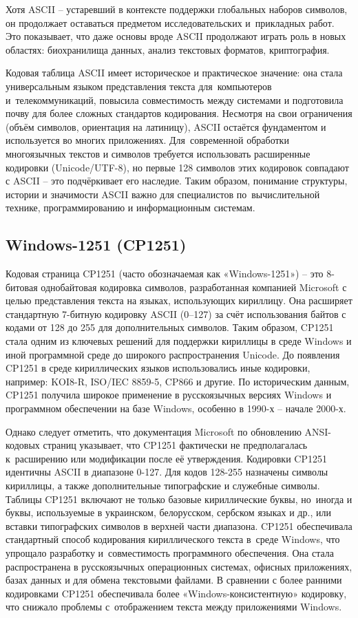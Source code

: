 \documentclass{ou}
\begin{document}
Хотя ASCII -- устаревший в контексте поддержки глобальных наборов символов, он продолжает оставаться предметом исследовательских и~прикладных работ. Это показывает, что даже основы вроде ASCII продолжают играть роль в новых областях: биохранилища данных, анализ текстовых форматов, криптография.

Кодовая таблица ASCII имеет историческое и практическое значение: она стала универсальным языком представления текста для~компьютеров и~телекоммуникаций, повысила совместимость между системами и подготовила почву для более сложных стандартов кодирования. Несмотря на свои ограничения (объём символов, ориентация на латиницу), ASCII остаётся фундаментом и используется во многих приложениях. Для~современной обработки многоязычных текстов и символов требуется использовать расширенные кодировки (Unicode/UTF-8), но первые 128 символов этих кодировок совпадают с ASCII -- это подчёркивает его наследие. Таким образом, понимание структуры, истории и значимости ASCII важно для специалистов по~вычислительной технике, программированию и информационным системам.
\subsection{Windows-1251 (CP1251)}
Кодовая страница CP1251 (часто обозначаемая как «Windows-1251») -- это 8-битовая однобайтовая кодировка символов, разработанная компанией Microsoft с целью представления текста на языках, использующих кириллицу. Она расширяет стандартную 7-битную кодировку ASCII (0--127) за счёт использования байтов с кодами от 128 до 255 для дополнительных символов. Таким образом, CP1251 стала одним из ключевых решений для поддержки кириллицы в среде Windows и иной программной среде до широкого распространения Unicode. До появления CP1251 в среде кириллических языков использовались иные кодировки, например: KOI8-R, ISO/IEC 8859-5, CP866 и другие. По историческим данным, CP1251 получила широкое применение в русскоязычных версиях Windows и программном обеспечении на базе Windows, особенно в 1990-х -- начале 2000-х.

Однако следует отметить, что документация Microsoft по обновлению ANSI-кодовых страниц указывает, что CP1251 фактически не предполагалась к~расширению или модификации после её утверждения. Кодировки CP1251 идентичны ASCII в диапазоне 0-127. Для кодов 128-255 назначены символы кириллицы, а также дополнительные типографские и служебные символы. Таблицы CP1251 включают не только базовые кириллические буквы, но~иногда и буквы, используемые в украинском, белорусском, сербском языках и др., или вставки типографских символов в верхней части диапазона. CP1251 обеспечивала стандартный способ кодирования кириллического текста в~среде Windows, что упрощало разработку и~совместимость программного обеспечения. Она стала распространена в русскоязычных операционных системах, офисных приложениях, базах данных и для обмена текстовыми файлами. В сравнении с более ранними кодировками CP1251 обеспечивала более «Windows-консистентную» кодировку, что снижало проблемы с~отображением текста между приложениями Windows.
\end{document}
